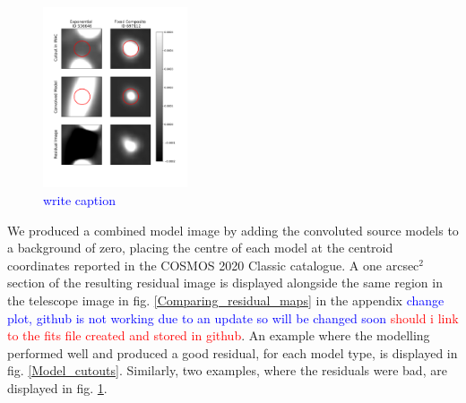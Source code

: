 \begin{figure}
    \centering %
    \includegraphics[trim={1cm 2.5cm 2cm 1.5cm},clip,width=0.38\textwidth]{Code/Saved_Figures/BAD_model_cutouts.pdf}
    \caption{\textcolor{blue}{write caption}}
    \label{BAD_Model_cutouts}  
\end{figure}

We produced a combined model image by adding the convoluted source models to a background of zero, placing the centre of each model at the centroid coordinates reported in the COSMOS 2020 Classic catalogue. A one arcsec$^2$ section of the resulting residual image is displayed alongside the same region in the telescope image in fig. \ref{Comparing_residual_maps} in the appendix \textcolor{blue}{change plot, github is not working due to an update so will be changed soon} \textcolor{red}{should i link to the fits file created and stored in github}. An example where the modelling performed well and produced a good residual, for each model type, is displayed in fig. \ref{Model_cutouts}. Similarly, two examples, where the residuals were bad, are displayed in fig. \ref{BAD_Model_cutouts}.

